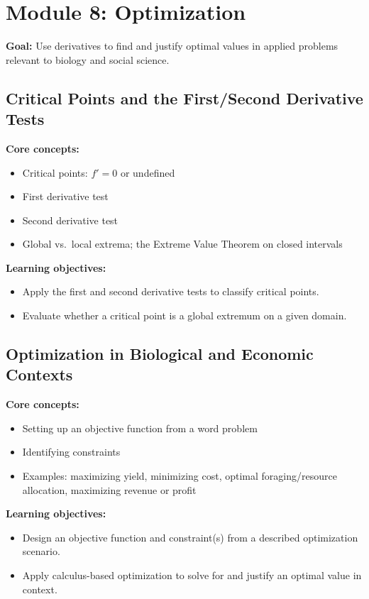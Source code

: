 \documentclass{article}
\begin{document}
\section{Module 8: Optimization}
\textbf{Goal:} Use derivatives to find and justify optimal values in applied problems relevant to biology and social science.

\subsection{Critical Points and the First/Second Derivative Tests}
\textbf{Core concepts:}
\begin{itemize}[leftmargin=*]
  \item Critical points: $f'=0$ or undefined
  \item First derivative test
  \item Second derivative test
  \item Global vs.\ local extrema; the Extreme Value Theorem on closed intervals
\end{itemize}
\textbf{Learning objectives:}
\begin{itemize}[leftmargin=*]
  \item Apply the first and second derivative tests to classify critical points.
  \item Evaluate whether a critical point is a global extremum on a given domain.
\end{itemize}

\subsection{Optimization in Biological and Economic Contexts}
\textbf{Core concepts:}
\begin{itemize}[leftmargin=*]
  \item Setting up an objective function from a word problem
  \item Identifying constraints
  \item Examples: maximizing yield, minimizing cost, optimal foraging/resource allocation, maximizing revenue or profit
\end{itemize}
\textbf{Learning objectives:}
\begin{itemize}[leftmargin=*]
  \item Design an objective function and constraint(s) from a described optimization scenario.
  \item Apply calculus-based optimization to solve for and justify an optimal value in context.
\end{itemize}
\end{document}
